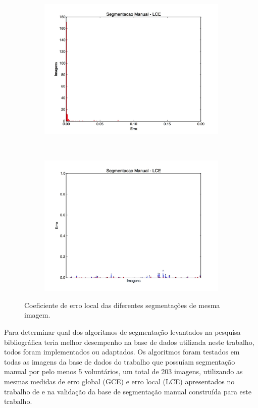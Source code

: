 \begin{figure}[h]
  \centering
  \begin{subfigure}[b]{0.5\textwidth}
    \includegraphics[width=\textwidth]{imgs/manual_lce}
  \end{subfigure}%
  ~
  \begin{subfigure}[b]{0.5\textwidth}
    \includegraphics[width=\textwidth]{imgs/manual_dist_lce}
  \end{subfigure}%
  \caption{Coeficiente de erro local das diferentes segmentações de mesma imagem.}
  \label{fig:manual_lce}
\end{figure}

Para determinar qual dos algoritmos de segmentação levantados na pesquisa bibliográfica teria melhor desempenho na base de dados utilizada neste trabalho, todos foram implementados ou adaptados. Os algoritmos foram testados em todas as imagens da base de dados do trabalho que possuíam segmentação manual por pelo menos 5 voluntários, um total de 203 imagens, utilizando as mesmas medidas de erro global (GCE) e erro local (LCE) apresentados no trabalho de  e na validação da base de segmentação manual construída para este trabalho.

